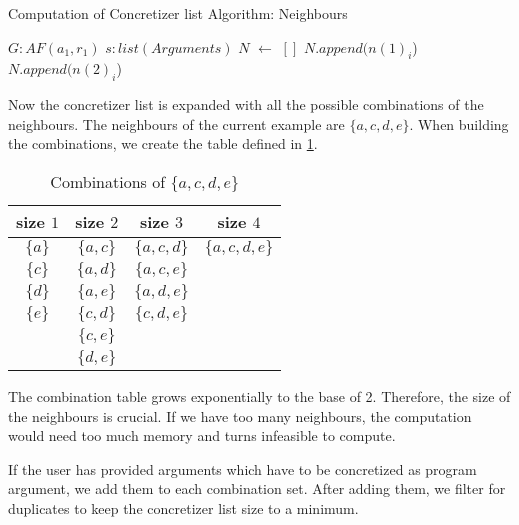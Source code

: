 \begin{algorithm}
    \caption{Computation of Concretizer list Algorithm: Neighbours}\label{alg:concretizerListNeighbours}
    \begin{algorithmic}[1]
        \Require $G: AF(a_1, r_1)$ 
        \Require $s: list(Arguments)$ 
        \State $N$ $\gets$ $[]$ 
         
             
                 
                    \State $N.append(n(1)_i$)
                    \State $N.append(n(2)_i$)
                \EndFor
            \EndFor
        \EndFor
    \end{algorithmic}
\end{algorithm}


Now the concretizer list is expanded with all the possible combinations of the neighbours. The neighbours of the current example are $\{a, c, d, e\}$. When building the combinations, we create the table defined in \cref{table:algorithmConcretizer1}.

\begin{table}[htb]
    \centering
    \begin{tabular}{ |c|c|c|c| }
     \hline
     size $1$ & size $2$ & size $3$ & size $4$\\
     \hline
     \hline
     $\{a\}$ & $\{a, c\}$ & $\{a, c, d\}$ &$\{a, c, d, e\}$ \\
     \hline
     $\{c\}$ & $\{a, d\}$ & $\{a, c, e\}$ & \\
     \hline
     $\{d\}$ & $\{a, e\}$ & $\{a, d, e\}$ & \\
     \hline
     $\{e\}$ & $\{c, d\}$ & $\{c, d, e\}$ & \\
     \hline
       & $\{c, e\}$ &  & \\
     \hline
       & $\{d, e\}$ &  & \\
     \hline
    \end{tabular}
\caption{Combinations of $\{a, c, d, e\}$}
\label{table:algorithmConcretizer1}

\end{table}

The combination table grows exponentially to the base of 2. Therefore, the size of the neighbours is crucial. If we have too many neighbours, the computation would need too much memory and turns infeasible to compute.

If the user has provided arguments which have to be concretized as program argument, we add them to each combination set. After adding them, we filter for duplicates to keep the concretizer list size to a minimum.

